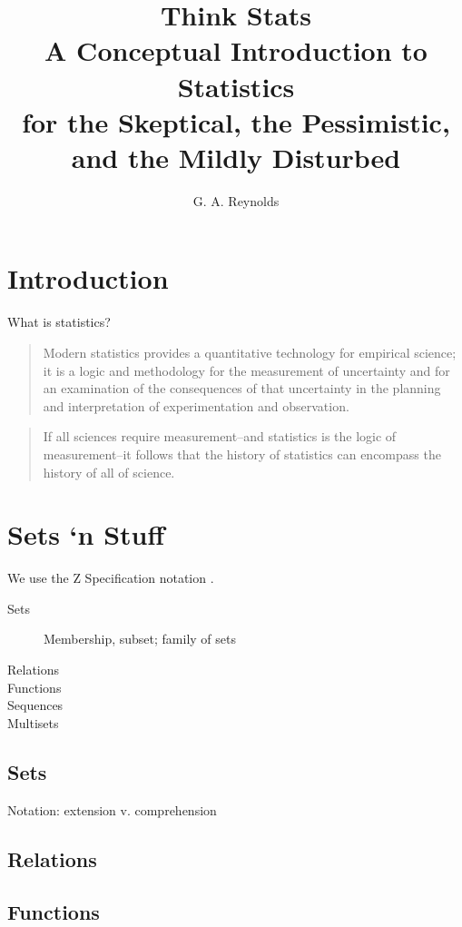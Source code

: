 \documentclass[reqno,12pt]{article}
\title{Think Stats \\
\vspace{12pt}
\Large A Conceptual Introduction to Statistics \\
\vspace{12pt}
\large for the Skeptical, the Pessimistic, and the Mildly Disturbed}
\author{G. A. Reynolds}
\numberwithin{equation}{subsection}
\begin{document}
\maketitle

\tableofcontents

\section{Introduction}

What is statistics?

\blockquote{Modern statistics provides a quantitative technology for
  empirical science; it is a logic and methodology for the measurement
  of uncertainty and for an examination of the consequences of that
  uncertainty in the planning and interpretation of experimentation
  and observation.\parencite[1]{stigler_history_1986}}

\blockquote{If all sciences require measurement--and statistics is the
  logic of measurement--it follows that the history of statistics can
  encompass the history of all of
  science.\parencite[2]{stigler_history_1986}}

\section{Sets `n Stuff}

We use the Z Specification notation \parencite{z-iso-13568}.

\begin{description}
\item [Sets] Membership, subset; family of sets
\item [Relations]
\item [Functions]
\item [Sequences]
\item [Multisets]
\end{description}

\subsection{Sets}

Notation: extension v. comprehension


\subsection{Relations}

\subsection{Functions}
\end{document}

